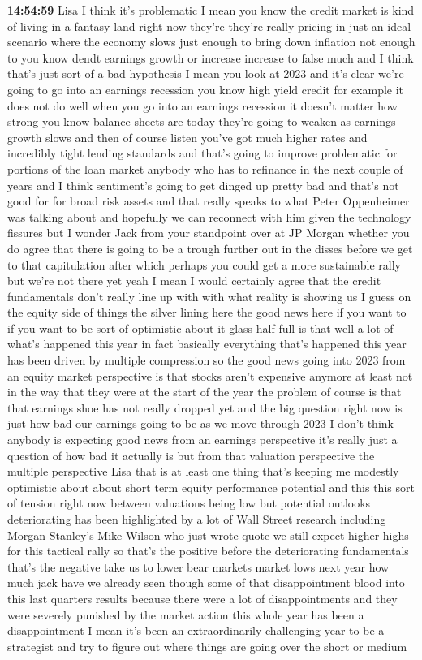 \documentclass{article}%
\begin{document}
\textbf{14:54:59}%
\newline%
Lisa I think it's problematic I mean you know the credit market is kind of living in a fantasy land right now they're they're really pricing in just an ideal scenario where the economy slows just enough to bring down inflation not enough to you know dendt earnings growth or increase increase to false much and I think that's just sort of a bad hypothesis I mean you look at 2023 and it's clear we're going to go into an earnings recession you know high yield credit for example it does not do well when you go into an earnings recession it doesn't matter how strong you know balance sheets are today they're going to weaken as earnings growth slows and then of course listen you've got much higher rates and incredibly tight lending standards and that's going to improve problematic for portions of the loan market anybody who has to refinance in the next couple of years and I think sentiment's going to get dinged up pretty bad and that's not good for for broad risk assets and that really speaks to what Peter Oppenheimer was talking about and hopefully we can reconnect with him given the technology fissures but I wonder Jack from your standpoint over at JP Morgan whether you do agree that there is going to be a trough further out in the disses before we get to that capitulation after which perhaps you could get a more sustainable rally but we're not there yet yeah I mean I would certainly agree that the credit fundamentals don't really line up with with what reality is showing us I guess on the equity side of things the silver lining here the good news here if you want to if you want to be sort of optimistic about it glass half full is that well a lot of what's happened this year in fact basically everything that's happened this year has been driven by multiple compression so the good news going into 2023 from an equity market perspective is that stocks aren't expensive anymore at least not in the way that they were at the start of the year the problem of course is that that earnings shoe has not really dropped yet and the big question right now is just how bad our earnings going to be as we move through 2023 I don't think anybody is expecting good news from an earnings perspective it's really just a question of how bad it actually is but from that valuation perspective the multiple perspective Lisa that is at least one thing that's keeping me modestly optimistic about about short term equity performance potential and this this sort of tension right now between valuations being low but potential outlooks deteriorating has been highlighted by a lot of Wall Street research including Morgan Stanley's Mike Wilson who just wrote quote we still expect higher highs for this tactical rally so that's the positive before the deteriorating fundamentals that's the negative take us to lower bear markets market lows next year how much jack have we already seen though some of that disappointment blood into this last quarters results because there were a lot of disappointments and they were severely punished by the market action this whole year has been a disappointment I mean it's been an extraordinarily challenging year to be a strategist and try to figure out where things are going over the short or medium 
\end{document}
